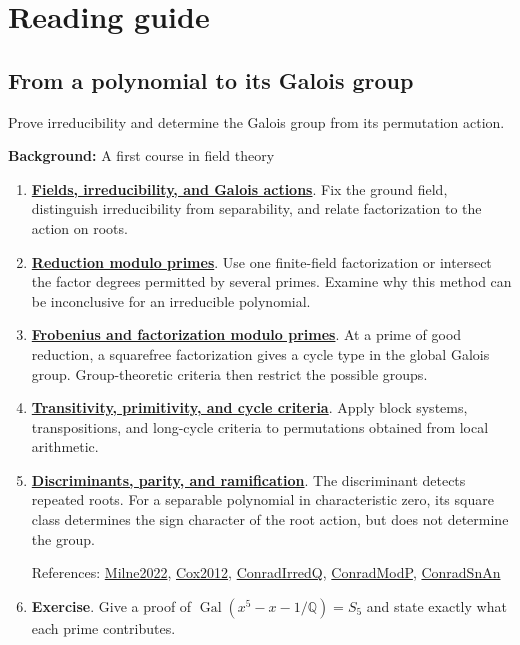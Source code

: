 \documentclass[11pt,a4paper,oneside,openany]{book}
\begin{document}
\chapter{Reading guide}
\section*{From a polynomial to its Galois group}
Prove irreducibility and determine the Galois group from its permutation action.\par
\textbf{Background:} A first course in field theory\par
\begin{enumerate}
\item \textbf{\hyperlink{article:foundations}{Fields, irreducibility, and Galois actions}}. Fix the ground field, distinguish irreducibility from separability, and relate factorization to the action on roots.\par
\item \textbf{\hyperlink{article:modular-irreducibility}{Reduction modulo primes}}. Use one finite-field factorization or intersect the factor degrees permitted by several primes. Examine why this method can be inconclusive for an irreducible polynomial.\par
\item \textbf{\hyperlink{article:frobenius}{Frobenius and factorization modulo primes}}. At a prime of good reduction, a squarefree factorization gives a cycle type in the global Galois group. Group-theoretic criteria then restrict the possible groups.\par
\item \textbf{\hyperlink{article:permutation-groups}{Transitivity, primitivity, and cycle criteria}}. Apply block systems, transpositions, and long-cycle criteria to permutations obtained from local arithmetic.\par
\item \textbf{\hyperlink{article:discriminants}{Discriminants, parity, and ramification}}. The discriminant detects repeated roots. For a separable polynomial in characteristic zero, its square class determines the sign character of the root action, but does not determine the group.\par
{\footnotesize References: \hyperlink{ref:Milne2022}{Milne2022}, \hyperlink{ref:Cox2012}{Cox2012}, \hyperlink{ref:ConradIrredQ}{ConradIrredQ}, \hyperlink{ref:ConradModP}{ConradModP}, \hyperlink{ref:ConradSnAn}{ConradSnAn}}\par
\item \textbf{Exercise}. Give a proof of \(\operatorname{Gal}(x^5-x-1/\mathbb Q)=S_5\) and state exactly what each prime contributes.\par
\end{enumerate}
\end{document}

